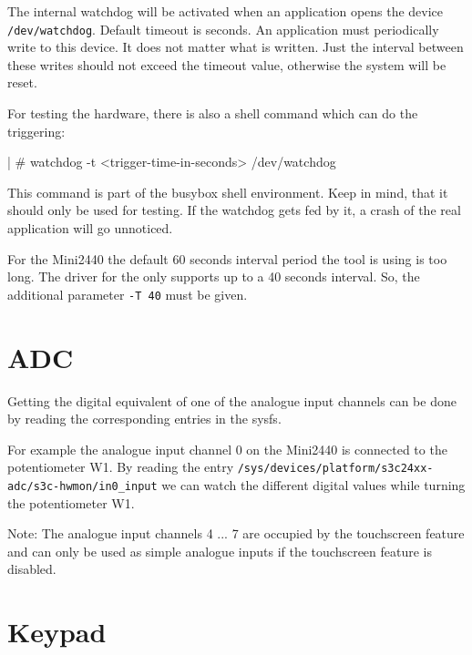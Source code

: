 The internal watchdog will be activated when an application opens the device
\texttt{/dev/watchdog}. Default timeout is \perWatchdogTimeout{} seconds.
An application must periodically write to this device. It does not matter what
is written. Just the interval between these writes should not exceed the
timeout value, otherwise the system will be reset.

For testing the hardware, there is also a shell command which can do the
triggering:

\begin{ptxshell}{|}
# watchdog -t <trigger-time-in-seconds> /dev/watchdog
\end{ptxshell}

This command is part of the busybox shell environment. Keep in mind, that
it should only be used for testing. If the watchdog gets fed by it, a crash of
the real application will go unnoticed.

For the Mini2440 the default 60 seconds interval period the
tool is using is too long. The driver for the \perCpuName{} only supports up to
a 40 seconds interval. So, the additional parameter \texttt{-T 40} must be
given.


\section{ADC}							\label{sec:ADC}

Getting the digital equivalent of one of the analogue input channels can be
done by reading the corresponding entries in the sysfs.

For example the analogue input channel 0 on the Mini2440 is connected to the
potentiometer W1. By reading the entry
\texttt{/sys/devices/platform/s3c24xx-adc/s3c-hwmon/in0\_input}
we can watch the different digital values while turning the potentiometer W1.

Note: The analogue input channels 4 ... 7 are occupied by the touchscreen
feature and can only be used as simple analogue inputs if the touchscreen
feature is disabled.


\section{Keypad}						\label{sec:ADC}

